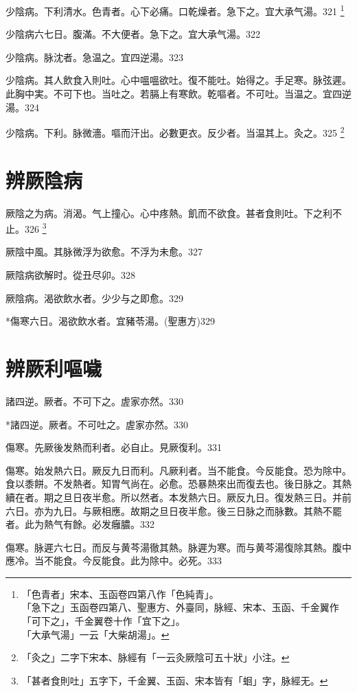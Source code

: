 \documentclass[b5paper,twoside,zihao=-4,UTF8]{ctexbook}
\begin{document}
少陰病。{下}利清水。色青者。心下必痛。口乾燥者。急下之。宜{大}承气湯。321
	\footnote{「色青者」宋本、玉函卷四第八作「色純青」。\\「急下之」玉函卷四第八、聖惠方、外臺同，脉經、宋本、玉函、千金翼作「可下之」，千金翼卷十作「宜下之」。\\「大承气湯」一云「大柴胡湯」。}

少陰病六七日。腹滿。不大便者。急下之。宜{大}承气湯。322

少陰病。脉沈者。急温之。宜四逆湯。323

少陰病。其人飲食入則吐。心中嗢嗢欲吐。復不能吐。始得之。手足寒。脉弦遲。此胸中実。不可下也。当吐之。若膈上有寒飲。乾嘔者。不可吐。当温之。宜四逆湯。324

少陰病。下利。脉微濇。嘔而汗出。必數更衣。反少者。当温其上。灸之。325
	\footnote{「灸之」二字下宋本、脉經有「一云灸厥陰可五十狀」小注。}

\chapter{辨厥陰病}

厥陰之为病。消渴。气上撞{心}。心中疼熱。飢而不欲食。{甚者}食則吐。下之利不止。326
	\footnote{「甚者食則吐」五字下，千金翼、玉函、宋本皆有「蛔」字，脉經无。}

厥陰中風。其脉微浮为欲愈。不浮为未愈。327

厥陰病欲解时。從丑尽卯。328

厥陰病。渴欲飲水者。少少与之即愈。329

*傷寒六日。渴欲飲水者。宜豬苓湯。(聖惠方)329

\chapter{辨厥利嘔噦}

諸四逆。厥者。不可下之。虗家亦然。330

*諸四逆。厥者。不可吐之。虗家亦然。330

傷寒。先厥後发熱而利者。必自止。見厥復利。331

傷寒。始发熱六日。厥反九日而利。凡厥利者。当不能食。今反能食。恐为除中。食以黍餅。不发熱者。知胃气尚在。必愈。恐暴熱來出而復去也。後日脉之。其熱續在者。期之旦日夜半愈。所以然者。本发熱六日。厥反九日。復发熱三日。并前六日。亦为九日。与厥相應。故期之旦日夜半愈。後三日脉之而脉數。其熱不罷者。此为熱气有餘。必发癰膿。332

傷寒。脉遲六七日。而反与黄芩湯徹其熱。脉遲为寒。而与黄芩湯復除其熱。腹中應冷。当不能食。今反能食。此为除中。必死。333
\end{document}

